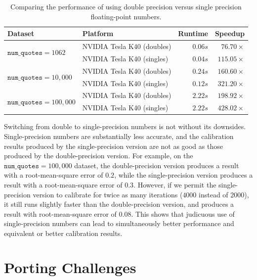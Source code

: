 \documentclass{article}
\begin{document}
\begin{table}
  \centering
\begin{tabular}{l|l|r|r}
  \textbf{Dataset} & \textbf{Platform} & \textbf{Runtime} & \textbf{Speedup} \\\hline\hline

  \multirow{2}{*}{$\texttt{num\_quotes}=1062$} & NVIDIA Tesla K40 (doubles) & $0.06s$ & $76.70\times$ \\
  & NVIDIA Tesla K40 (singles) & $0.04s$ & $115.05\times$ \\\hline

  \multirow{2}{*}{$\texttt{num\_quotes}=10,000$} & NVIDIA Tesla K40 (doubles) & $0.24s$ & $160.60\times$  \\
  & NVIDIA Tesla K40 (singles) & $0.12s$ & $321.20\times$ \\\hline

  \multirow{2}{*}{$\texttt{num\_quotes}=100,000$} & NVIDIA Tesla K40 (doubles) & $2.22s$ & $198.92\times$ \\
  & NVIDIA Tesla K40 (singles) & $2.22s$ & $428.02\times$ \\
\end{tabular}
\caption{Comparing the performance of using double precision versus
  single precision floating-point numbers.}
  \label{tab:single-precision}
\end{table}

Switching from double to single-precision numbers is not without its
downsides.  Single-precision numbers are substantially less accurate,
and the calibration results produced by the single-precision version
are not as good as those produced by the double-precision version.
For example, on the $\texttt{num\_quotes}=100,000$ dataset, the
double-precision version produces a result with a root-mean-square
error of $0.2$, while the single-precision version produces a result
with a root-mean-square error of $0.3$.  However, if we permit the
single-precision version to calibrate for twice as many iterations
($4000$ instead of $2000$), it still runs slightly faster than the
double-precision version, and produces a result with root-mean-square
error of $0.08$.  This shows that judicuous use of single-precision
numbers can lead to simultaneously better performance and equivalent
or better calibration results.

\section{Porting Challenges}
\end{document}
